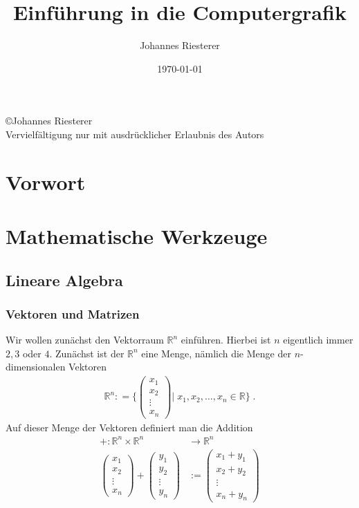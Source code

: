 \documentclass[]{article}
\begin{document}
\title{Einführung in die Computergrafik}
\author{Johannes Riesterer}
\date{\today}
\maketitle
\newpage 
\begin{center}
\large
 \copyright Johannes Riesterer \\
Vervielfältigung nur mit ausdrücklicher Erlaubnis des Autors
\end{center}

\newpage

\section*{Vorwort}


\tableofcontents
\newpage

\section{Mathematische Werkzeuge}

\subsection{Lineare Algebra}
\subsubsection{Vektoren und Matrizen}
Wir wollen zunächst  den Vektorraum $\mathbb{R}^n$ einführen. Hierbei ist $n$ eigentlich immer $2,3$ oder $4$.
Zunächst ist der $\mathbb{R}^n$  eine Menge, nämlich die Menge der $n$-dimensionalen Vektoren 
\begin{align*}
\mathbb{R}^n : = \Biggl \{
\begin{pmatrix}
x_1 \\ x_2 \\ \vdots \\ x_n
\end{pmatrix} \Bigg | \; x_1, x_2, \hdots ,x_n \in \mathbb{R}
 \Biggr \}  \; .
\end{align*}
Auf dieser Menge der Vektoren definiert man die Addition
\begin{align*}
+ : \mathbb{R}^n \times  \mathbb{R}^n   & \to \mathbb{R}^n \\
\begin{pmatrix}
x_1 \\ x_2 \\ \vdots \\ x_n
\end{pmatrix}  +  
\begin{pmatrix}
y_1 \\ y_2 \\ \vdots \\ y_n
\end{pmatrix} 
&  :=  \begin{pmatrix}
x_1 + y_1 \\ x_2  + y_2 \\ \vdots \\ x_n + y_n
\end{pmatrix} 
\end{align*}
\end{document}
